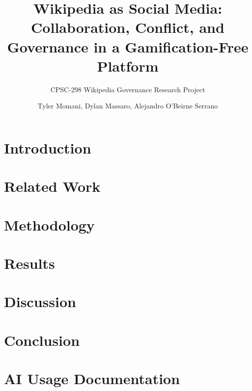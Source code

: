 \documentclass[sigconf,screen]{acmart}
\title{Wikipedia as Social Media: Collaboration, Conflict, and Governance in a Gamification-Free Platform}
\subtitle{CPSC-298 Wikipedia Governance Research Project}
\author{Tyler Momani, Dylan Massaro, Alejandro O’Beirne Serrano}
\affiliation{%
  \institution{Chapman University}
  \city{Orange, CA}
  \country{USA}
}
\begin{document}
\maketitle

\section{Introduction}


\section{Related Work}


\section{Methodology}


\section{Results}


\section{Discussion}


\section{Conclusion}





\appendix
\section{AI Usage Documentation}

\end{document}
